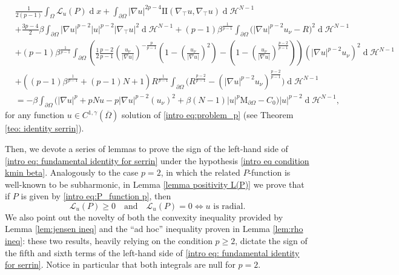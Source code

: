 \documentclass[10pt,a4paper]{amsart}
\numberwithin{equation}{section}
\renewcommand{\d}[1]{\ensuremath{\operatorname{d}\!{#1}}}
\begin{document}
\begin{equation}\label{intro eq: fundamental identity for serrin}
    \begin{aligned}
    &\frac{1}{2(p-1)}\int_\Omega \mathcal{L}_u(P) \d{x} +\int_{\partial\Omega} |\nabla u|^{2p-4} \mathrm{I\!I}(\nabla_\top u,\nabla_\top u) \d{}\mathcal{H}^{N-1} 
    \\
    &+ \frac{3p-4}{2} \beta \int_{\partial\Omega} |\nabla u|^{p-2}|u|^{p-2}|\nabla_\top u|^2 \d{}\mathcal{H}^{N-1} 
    + (p-1) \beta^{\frac{1}{p-1}} \int_{\partial\Omega} \Big(|\nabla u|^{p-2} u_\nu - R \Big)^2  \d{}\mathcal{H}^{N-1}  
    \\
    &
    + (p-1) \beta^{\frac{1}{p-1}}  \int_{\partial\Omega}  \left( \frac{1}{2} \frac{p-2}{p-1} \left(\frac{u_\nu}{|\nabla u|}\right)^{-\frac{p}{p-1}} \left(1- \left(\frac{u_\nu}{|\nabla u|}\right)^2 \right) - \left(1- \left(\frac{u_\nu}{|\nabla u|}\right)^{\frac{p-2}{p-1}} \right) \right) (|\nabla u|^{p-2} u_\nu)^2 \d{}\mathcal{H}^{N-1} 
    \\
    &
    + \left( (p-1) \beta^{\frac{1}{p-1}} + (p-1)N + 1 \right) R^{\frac{1}{p-1}}  \int_{\partial\Omega} \Big( R^{\frac{p-2}{p-1}} - (|\nabla u|^{p-2} u_\nu)^{\frac{p-2}{p-1}} \Big)  \d{}\mathcal{H}^{N-1}
    \\
    &
    = - \beta \int_{\partial\Omega} \Big( |\nabla u|^p + pNu - p |\nabla u|^{p-2} (u_\nu)^2 + \beta(N-1) |u|^p \mathrm{M}_{\partial\Omega}  - C_0 \Big) |u|^{p-2} \d{}\mathcal{H}^{N-1},  
    \end{aligned}
\end{equation}
for any function $u \in C^{1,\gamma}(\overline{\Omega})$ solution of \eqref{intro eq:problem_p} (see Theorem \ref{teo: identity serrin}).

Then, we devote a series of lemmas to prove the sign of the left-hand side of \eqref{intro eq: fundamental identity for serrin} under the hypothesis \eqref{intro eq condition kmin beta}. 
Analogously to the case $p=2$, in which the related $P$-function is well-known to be subharmonic, in Lemma \ref{lemma positivity L(P)}  we prove that if $P$ is given by \eqref{intro eq:P_function p}, then
\[
\mathcal{L}_u(P) \geq 0 \quad \text{and} \quad \mathcal{L}_u(P)=0 \iff u \text{ is radial}.
\]
We also point out the novelty of both the convexity inequality provided by Lemma \ref{lem:jensen ineq} and the ``ad hoc'' inequality proven in Lemma \ref{lem:rho ineq}: these two results, heavily relying on the condition $p\geq 2$, dictate the sign of the fifth and sixth terms of the left-hand side of \eqref{intro eq: fundamental identity for serrin}. Notice in particular that both integrals are null for $p=2$.
\end{document}

